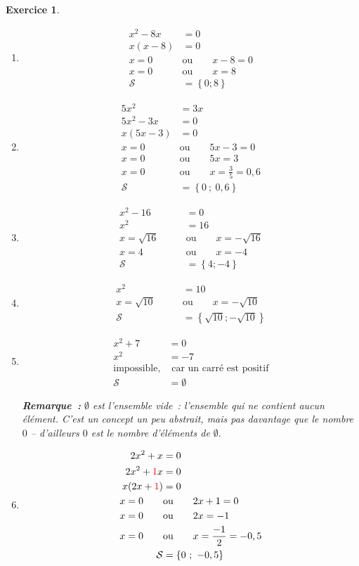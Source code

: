 \documentclass[10pt]{article}
\newtheorem{exo}{Exercice}
\begin{document}
\begin{exo}
\begin{multicols}{2}
\begin{enumerate}
\item \begin{align*}x^2-8x&=0\\
x(x-8)&=0\\
x=0 \qquad &\text{ou}\qquad x-8=0\\
x=0  \qquad &\text{ou}\qquad x=8\\
\mathcal{S}&=\left\{0;8\right\}
\end{align*}
\item \begin{align*}5x^2&=3x\\
5x^2-3x&=0\\
x(5x-3)&=0\\
x=0 \qquad &\text{ou}\qquad 5x-3=0\\
x=0 \qquad &\text{ou}\qquad 5x=3\\
x=0  \qquad &\text{ou}\qquad x=\frac{3}{5}=0,6\\
\mathcal{S}&=\left\{0~;~0,6\right\}
\end{align*}
\item \begin{align*}x^2-16&=0\\
x^2&=16\\
x=\sqrt{16} \qquad &\text{ou}\qquad x=-\sqrt{16}\\
x=4  \qquad &\text{ou}\qquad x=-4\\
\mathcal{S}&=\left\{4;-4\right\}
\end{align*}

\item \begin{align*}
x^2&=10\\
x=\sqrt{10} \qquad &\text{ou}\qquad x=-\sqrt{10}\\
\mathcal{S}&=\left\{\sqrt{10};-\sqrt{10}\right\}
\end{align*}
\item \begin{align*}x^2+7&=0\\
x^2&=-7\\
\text{impossible,}&\text{ car un carré est positif}\\
\mathcal{S}&=\emptyset
\end{align*}

\medskip

\textbf{Remarque~:} $\emptyset$ est l'ensemble vide~: l'ensemble qui ne contient aucun élément. C'est un concept un peu abstrait, mais pas davantage que le nombre $0$ -- d'ailleurs $0$ est le nombre d'éléments de $\emptyset.$
\item \begin{align*}
2x^2+x&=0\\2x^2+\textcolor{red}{1}x&=0\\
x(2x+\textcolor{red}{1})&=0\\
x=0 \qquad &\text{ou}\qquad 2x+1=0\\
x=0 \qquad &\text{ou}\qquad 2x=-1\\
x=0  \qquad &\text{ou}\qquad x=\frac{-1}{2}=-0,5\\
\mathcal{S}&=\left\{0~;~-0,5\right\}
\end{align*}


\end{enumerate}
\end{multicols}
\end{exo}
\end{document}
